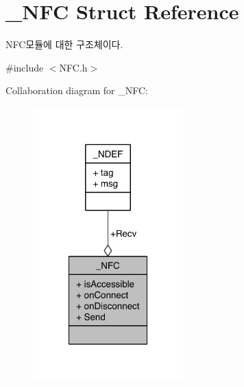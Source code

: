 \hypertarget{struct__NFC}{\section{\-\_\-\-N\-F\-C Struct Reference}
\label{struct__NFC}
}


N\-F\-C모듈에 대한 구조체이다.  




{\ttfamily \#include $<$N\-F\-C.\-h$>$}



Collaboration diagram for \-\_\-\-N\-F\-C\-:\nopagebreak
\begin{figure}[H]
\begin{center}
\leavevmode
\includegraphics[width=164pt]{db/d89/struct__NFC__coll__graph}
\end{center}
\end{figure}
